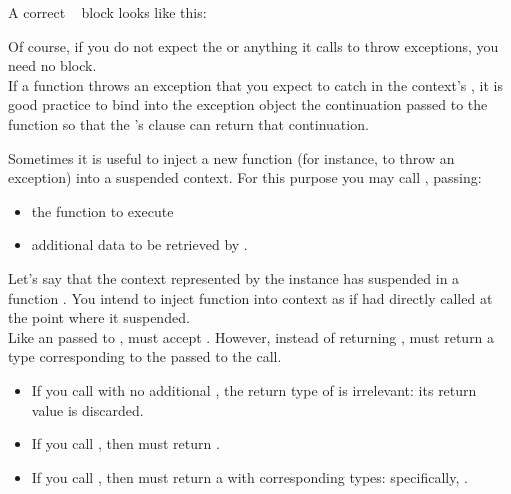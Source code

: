 A correct \entryfn\  block looks like this:

Of course, if you do not expect the \entryfn or anything it calls to throw
exceptions, you need no  block.\\

If a \resumewith function throws an exception that you expect to catch in the
context's \entryfn, it is good practice to bind into the exception object the
continuation passed to the \resumewith function so that
the \entryfn's  clause can return that continuation.

Sometimes it is useful to inject a new function (for instance, to throw an
exception) into a suspended context. For this purpose you may call
, passing:

\begin{itemize}
  \item the function  to execute
  \item additional data  to be retrieved by .
\end{itemize}

Let's say that the context represented by the \cont instance  has
suspended in a function . You intend to inject
function  into context  as if  had directly
called  at the point where it suspended.\\

Like an \entryfn passed to \callcc,  must
accept . However, instead of
returning \cont,  must return a type corresponding to the 
passed to the \resumewith call.

\begin{itemize}
  \item If you call  with no additional ,
  the return type of  is irrelevant: its return value is discarded.
  \item If you call , then 
  must return .
  \item If you call ,
  then  must return a  with corresponding types:
  specifically, .
\end{itemize}

